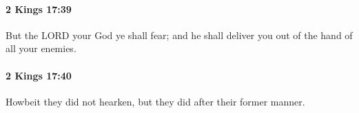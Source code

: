 		\paragraph{2 Kings 17:39} %
			\label{2KINGS-17-39}

			But the LORD your God ye shall fear; and he shall deliver you out of the hand of all your enemies.


		\paragraph{2 Kings 17:40} %
			\label{2KINGS-17-40}

			Howbeit they did not hearken, but they did after their former manner.


